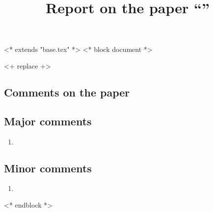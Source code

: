 <* extends "base.tex" *>
<* block document *>
\pagestyle{fancy}
\rhead{\today}
\cfoot{\thepage}


\title{Report on the paper ``\papername''}
\author{\journal}
\maketitle
<+ replace +>
\subsection*{Comments on the paper}
\subsection*{Major comments}
\begin{enumerate}
    \item <+ replace +>
\end{enumerate}
\subsection*{Minor comments}
\begin{enumerate}[resume]
    \item <+ replace +>
\end{enumerate}

<* endblock *>

